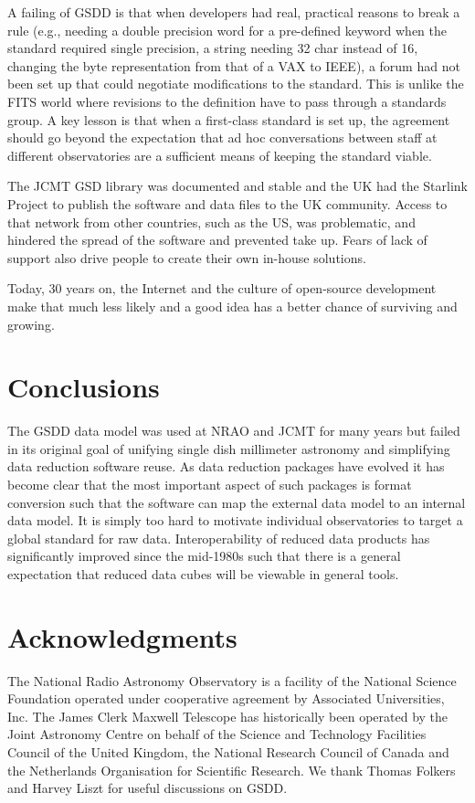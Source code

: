 \documentclass[final,authoryear,5p,times,twocolumn]{elsarticle}
\begin{document}
A failing of GSDD is that when developers had real, practical reasons
to break a rule (e.g., needing a double precision word for a
pre-defined keyword when the standard required single precision, a
string needing 32 char instead of 16, changing the byte representation
from that of a VAX to IEEE), a forum had not been set up that could
negotiate modifications to the standard.  This is unlike the FITS
world where revisions to the definition have to pass through a
standards group.  A key lesson is that when a first-class standard is
set up, the agreement should go beyond the expectation that ad hoc
conversations between staff at different observatories are a
sufficient means of keeping the standard viable.

The JCMT GSD library was documented and stable and the UK had the
Starlink Project \citep{1982QJRAS..23..485D} to publish the software
and data files to the UK community. Access to that network from other
countries, such as the US, was problematic, and hindered the spread of
the software and prevented take up. Fears of lack of support also
drive people to create their own in-house solutions.

Today, 30 years on, the Internet and the culture of open-source
development make that much less likely and a good idea has a better
chance of surviving and growing.

\section{Conclusions}

The GSDD data model was used at NRAO and JCMT for many years
but failed in its original goal of unifying single dish millimeter
astronomy and simplifying data reduction software reuse. As data
reduction packages have evolved it has become clear that the most
important aspect of such packages is format conversion such that the
software can map the external data model to an internal data model. It
is simply too hard to motivate individual observatories to target a
global standard for raw data. Interoperability of reduced data
products has significantly improved since the mid-1980s such that
there is a general expectation that reduced data cubes will be
viewable in general tools.


\section*{Acknowledgments}

The National Radio Astronomy Observatory is a facility of the National
Science Foundation operated under cooperative agreement by Associated
Universities, Inc.
The James Clerk Maxwell Telescope has historically been operated by
the Joint Astronomy Centre on behalf of the Science and Technology
Facilities Council of the United Kingdom, the National Research
Council of Canada and the Netherlands Organisation for Scientific
Research. We thank Thomas Folkers and Harvey Liszt for useful
discussions on GSDD.
\end{document}
